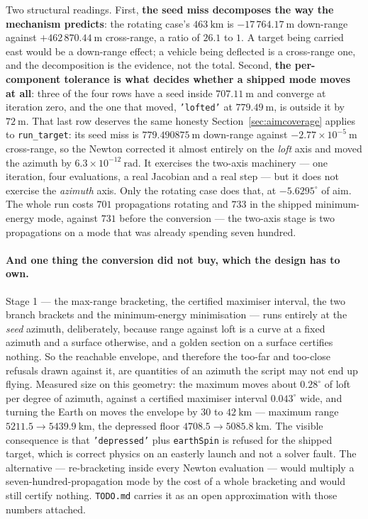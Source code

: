 \documentclass[11pt]{article}
\newcommand{\code}[1]{\texttt{#1}}
\begin{document}
Two structural readings. First, \textbf{the seed miss decomposes the way the
mechanism predicts}: the rotating case's $463~\mathrm{km}$ is
$-17\,764.17~\mathrm{m}$ down-range against $+462\,870.44~\mathrm{m}$
cross-range, a ratio of $26.1$ to $1$. A target being carried east would be a
down-range effect; a vehicle being deflected is a cross-range one, and the
decomposition is the evidence, not the total. Second, \textbf{the per-component
tolerance is what decides whether a shipped mode moves at all}: three of the
four rows have a seed inside $707.11~\mathrm{m}$ and converge at iteration
zero, and the one that moved, \code{'lofted'} at $779.49~\mathrm{m}$, is
outside it by $72~\mathrm{m}$. That last row deserves the same honesty
Section~\ref{sec:aimcoverage} applies to \code{run\_target}: its seed miss is
$779.490875~\mathrm{m}$ down-range against $-2.77\times10^{-5}~\mathrm{m}$
cross-range, so the Newton corrected it almost entirely on the \emph{loft}
axis and moved the azimuth by $6.3\times10^{-12}~\mathrm{rad}$. It exercises
the two-axis machinery --- one iteration, four evaluations, a real Jacobian and
a real step --- but it does not exercise the \emph{azimuth} axis. Only the
rotating case does that, at $-5.6295^{\circ}$ of aim. The whole run costs $701$ propagations rotating
and $733$ in the shipped minimum-energy mode, against $731$ before the
conversion --- the two-axis stage is two propagations on a mode that was
already spending seven hundred.

\paragraph{And one thing the conversion did not buy, which the design has to
own.} Stage 1 --- the max-range bracketing, the certified maximiser interval,
the two branch brackets and the minimum-energy minimisation --- runs entirely
at the \emph{seed} azimuth, deliberately, because range against loft is a curve
at a fixed azimuth and a surface otherwise, and a golden section on a surface
certifies nothing. So the reachable envelope, and therefore the too-far and
too-close refusals drawn against it, are quantities of an azimuth the script
may not end up flying. Measured size on this geometry: the maximum moves about
$0.28^{\circ}$ of loft per degree of azimuth, against a certified maximiser
interval $0.043^{\circ}$ wide, and turning the Earth on moves the envelope by
$30$ to $42~\mathrm{km}$ --- maximum range $5211.5 \to 5439.9~\mathrm{km}$, the
depressed floor $4708.5 \to 5085.8~\mathrm{km}$. The visible consequence is
that \code{'depressed'} plus \code{earthSpin} is refused for the shipped
target, which is correct physics on an easterly launch and not a solver fault.
The alternative --- re-bracketing inside every Newton evaluation --- would
multiply a seven-hundred-propagation mode by the cost of a whole bracketing and
would still certify nothing. \code{TODO.md} carries it as an open
approximation with those numbers attached.
\end{document}
